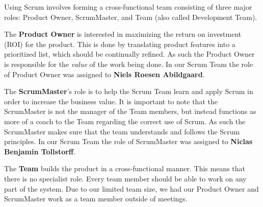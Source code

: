 Using Scrum involves forming a cross-functional team consisting of three major roles: Product Owner, ScrumMaster, and Team (also called Development Team).

The \textbf{Product Owner} is interested in maximizing the return on investment (ROI) for the product. This is done by translating product features into a prioritized list, which should be continually refined. As such the Product Owner is responsible for the \textit{value} of the work being done. In our Scrum Team the role of Product Owner was assigned to \textbf{Niels Roesen Abildgaard}.

The \textbf{ScrumMaster}'s role is to help the Scrum Team learn and apply Scrum in order to increase the business value. It is important to note that the ScrumMaster is not the manager of the Team members, but instead functions as more of a coach to the Team regarding the correct use of Scrum. As such the ScrumMaster makes sure that the team understands and follows the Scrum principles. In our Scrum Team the role of ScrumMaster was assigned to \textbf{Niclas Benjamin Tollstorff}.

The \textbf{Team} builds the product in a cross-functional manner. This means that there is no specialist role. Every team member should be able to work on any part of the system. Due to our limited team size, we had our Product Owner and ScrumMaster work as a team member outside of meetings.